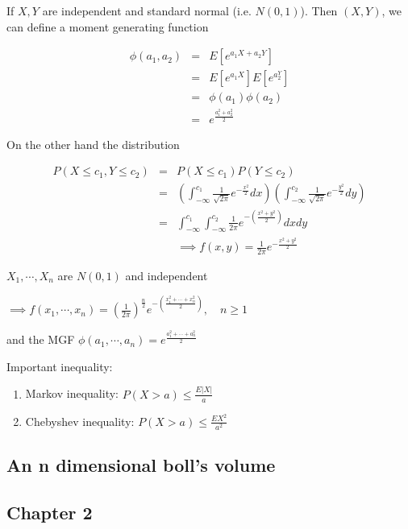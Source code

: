 \begin{ex*}
	If $X,Y$ are independent and standard normal (i.e. $N(0,1)$). Then $(X,Y)$, we can define a moment generating function
	
	\begin{eqnarray*}
	\phi(a_1,a_2) &=& E[e^{a_1X + a_2Y}] \\
	&=& E[e^{a_1X}]E[e^{a_2^Y}] \\
	&=& \phi(a_1)\phi(a_2) \\
	&=& e^{\frac{a_1^2 + a_2^2}{2}}
	\end{eqnarray*}
	
	On the other hand the distribution
	
	\begin{eqnarray*}
	P(X \leq c_1, Y \leq c_2) &=& P(X \leq c_1)P(Y \leq c_2) \\
	&=& \left(\int^{c_1}_{-\infty}\frac{1}{\sqrt{2\pi}}e^{-\frac{x^2}{2}}dx\right)\left(\int^{c_2}_{-\infty}\frac{1}{\sqrt{2\pi}}e^{-\frac{y^2}{2}}dy\right)\\
	&=& \int^{c_1}_{-\infty}\int^{c_2}_{-\infty}\frac{1}{2\pi}e^{-(\frac{x^2+y^2}{2})}dxdy\\
	& & \implies f(x,y) = \frac{1}{2\pi}e^{-\frac{x^2+y^2}{2}}
	\end{eqnarray*}
	
	$X_1,\cdots,X_n$ are $N(0,1)$ and independent
	
	$\implies f(x_1,\cdots,x_n) = (\frac{1}{2\pi})^{\frac{n}{2}}e^{-(\frac{x_1^2+\cdots+x_n^2}{2})},\quad n\geq 1$
	
	and the MGF $\phi(a_1,\cdots,a_n) = e^{\frac{a_1^2 + \cdots + a_n^2}{2}}$
\end{ex*}

Important inequality:

\begin{enumerate}
	\item Markov inequality: $P(X > a) \leq \frac{E|X|}{a}$
	\item Chebyshev inequality: $P(X > a) \leq \frac{EX^2}{a^2}$
\end{enumerate}

\subsection*{An n dimensional boll's volume}


\subsection*{Chapter 2}

